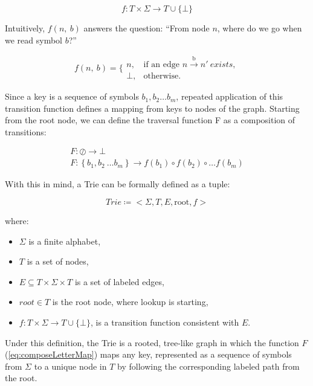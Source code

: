 \documentclass[pdflatex,sn-mathphys-num]{sn-jnl}%
\theoremstyle{thmstyleone}%
\theoremstyle{thmstyletwo}%
\theoremstyle{thmstylethree}%
\begin{document}
\begin{equation}
f:T \times \Sigma \rightarrow T \cup \{\bot\}
\end{equation}

Intuitively, \(f(n,~b)\) answers the question: ``From node
$n$, where do we go when we read symbol $b$?''

\begin{equation}
f(n,~b)= \Biggl\{
\begin{array}{ll}
    n, & \text{if an edge } n \xrightarrow{\text{b}}n' ~exists,\\
    \bot, & \text{otherwise}.
\end{array}\label{eq:mappingFunction}
\end{equation}


Since a key is a sequence of symbols \(b_1, b_2\dots b_m\), repeated application of this
transition function defines a mapping from keys to nodes of the graph. Starting from the
root node, we can define the traversal function F as a composition of transitions:

\begin{equation}
    \begin{array}{ll}
     F: \oslash  \rightarrow \bot \\
     F: \left\{ b_{1},b_{2}\ \dots b_{m} \right\} \rightarrow f( b_{1} ) \circ f(b_{2}) \circ \dots f(b_{m})
\end{array}\label{eq:composeLetterMap}
\end{equation}

With this in mind, a Trie can be formally defined as a tuple:

\begin{equation}
Trie \coloneqq < \Sigma, T, E, \mathrm{root}, f >
\end{equation}

where:

\begin{itemize}
\item
  $\Sigma$ is a finite alphabet,
\item
  $T$ is a set of nodes,
\item
  \(E \subseteq T \times \Sigma \times T\) is a set of labeled edges,
\item
  \(root \in T\) is the root node, where lookup is starting,
\item
  \(f:T \times \Sigma \rightarrow T \cup \{\bot\}\), is a transition
  function consistent with $E$.
\end{itemize}

Under this definition, the Trie is a rooted, tree-like graph in which
the function $F$ (\ref{eq:composeLetterMap}) maps any key, represented as a sequence of symbols
from $\Sigma$ to a unique node in $T$ by following the corresponding labeled
path from the root.
\end{document}
